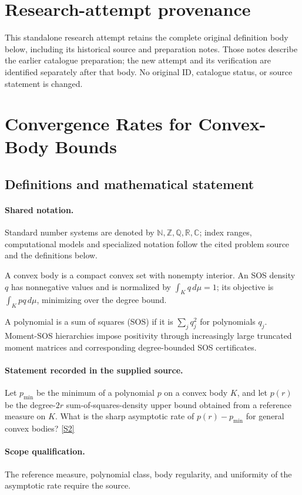 \documentclass[11pt]{article}
\begin{document}
\section*{Research-attempt provenance}
This standalone research attempt retains the complete original definition body below,
including its historical source and preparation notes. Those notes describe the
earlier catalogue preparation; the new attempt and its verification are identified
separately after that body. No original ID, catalogue status, or source statement is changed.

\section{Convergence Rates for Convex-Body Bounds}\label{statement}

\subsection{Definitions and mathematical statement}

\paragraph{Shared notation.}Standard number systems are denoted by $\mathbb N,\mathbb Z,\mathbb Q,\mathbb R,\mathbb C$; index ranges, computational models and specialized notation follow the cited problem source and the definitions below.


A convex body is a compact convex set with nonempty interior. An SOS density $q$ has nonnegative values and is normalized by $\int_Kq\,d\mu=1$; its objective is $\int_Kp q\,d\mu$, minimizing over the degree bound.

A polynomial is a sum of squares (SOS) if it is $\sum_j q_j^2$ for polynomials $q_j$. Moment-SOS hierarchies impose positivity through increasingly large truncated moment matrices and corresponding degree-bounded SOS certificates.
\paragraph{Statement recorded in the supplied source.}
Let $p_{\min}$ be the minimum of a polynomial $p$ on a convex body $K$, and let $p(r)$ be the degree-$2r$ sum-of-squares-density upper bound obtained from a reference measure on $K$. What is the sharp asymptotic rate of $p(r)-p_{\min}$ for general convex bodies? \href{https://doi.org/10.4171/owr/2018/50}{[S2]}
\paragraph{Scope qualification.}
The reference measure, polynomial class, body regularity, and uniformity of the asymptotic rate require the source.
\end{document}
